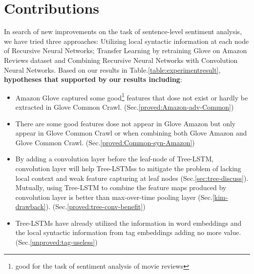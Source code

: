 \section{Contributions}
In search of new improvements on the task of sentence-level sentiment analysis, we have tried three approaches: Utilizing local syntactic information at each node of Recursive Neural Networks; Transfer Learning by retraining Glove on Amazon Reviews dataset and Combining Recursive Neural Networks with Convolution Neural Networks.
Based on our results in Table.\ref{table:experimentresult}, \textbf{hypotheses that supported by our results including}:
\begin{itemize}
\item Amazon Glove captured some good\footnote{good for the task of sentiment analysis of movie reviews} features that dose not exist or hardly be extracted in Glove Common Crawl. (Sec.\ref{proved:Amazon-adv-Common})

\item There are some good features dose not appear in Glove Amazon but only appear in Glove Common Crawl or when combining both Glove Amazon and Glove Common Crawl. (Sec.\ref{proved:Common-syn-Amazon})

\item By adding a convolution layer before the leaf-node of Tree-LSTM, convolution layer will help Tree-LSTMss to mitigate the problem of lacking local context and weak feature capturing at leaf nodes (Sec.\ref{sec:tree-discuss}).
Mutually, using Tree-LSTM to combine the feature maps produced by convolution layer is better than max-over-time pooling layer (Sec.\ref{kim-drawback}). (Sec.\ref{proved:tree-conv-benefit})

\item  Tree-LSTMs have already utilized the information in word embeddings and the local syntactic information from tag embeddings adding no more value. (Sec.\ref{unproved:tag-useless})
\end{itemize}

